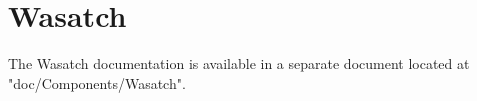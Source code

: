 
\chapter{Wasatch}
The Wasatch documentation is available in a separate document located at "doc/Components/Wasatch".

